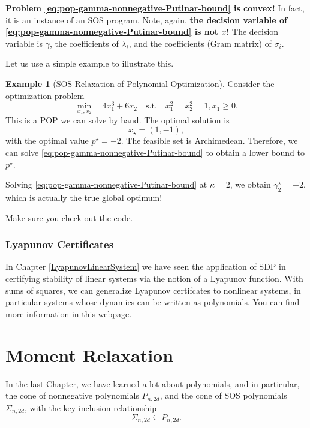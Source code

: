 \documentclass[
]{book}
\theoremstyle{definition}
\theoremstyle{definition}
\newtheorem{example}{Example}[chapter]
\theoremstyle{definition}
\theoremstyle{definition}
\theoremstyle{remark}
\begin{document}
\textbf{Problem \eqref{eq:pop-gamma-nonnegative-Putinar-bound} is convex!} In fact, it is an instance of an SOS program. Note, again, \textbf{the decision variable of \eqref{eq:pop-gamma-nonnegative-Putinar-bound} is not \(x\)!} The decision variable is \(\gamma\), the coefficients of \(\lambda_i\), and the coefficients (Gram matrix) of \(\sigma_i\).

Let us use a simple example to illustrate this.

\begin{example}[SOS Relaxation of Polynomial Optimization]
\protect\hypertarget{exm:SOSRelaxation}{}\label{exm:SOSRelaxation}Consider the optimization problem
\[
\min_{x_1,x_2} \quad 4 x_1^3 + 6 x_2  \quad \mathrm{s.t.}\quad x_1^2 = x_2^2 = 1, x_1 \geq 0.
\]
This is a POP we can solve by hand. The optimal solution is
\[
x_\star = (1,-1),
\]
with the optimal value \(p^\star = -2\).
The feasible set is Archimedean. Therefore, we can solve \eqref{eq:pop-gamma-nonnegative-Putinar-bound} to obtain a lower bound to \(p^\star\).

Solving \eqref{eq:pop-gamma-nonnegative-Putinar-bound} at \(\kappa=2\), we obtain \(\gamma_{2}^\star = -2\), which is actually the true global optimum!

Make sure you check out the \href{https://github.com/ComputationalRobotics/Semidefinite-Examples/blob/main/example_pop.m}{code}.
\end{example}

\subsection{Lyapunov Certificates}\label{lyapunov-certificates}

In Chapter \ref{LyapunovLinearSystem} we have seen the application of SDP in certifying stability of linear systems via the notion of a Lyapunov function. With sums of squares, we can generalize Lyapunov certifcates to nonlinear systems, in particular systems whose dynamics can be written as polynomials. You can \href{https://hankyang.seas.harvard.edu/OptimalControlEstimation/stability.html\#computing-lyapunov-certificates}{find more information in this webpage}.

\chapter{Moment Relaxation}\label{Moment}

In the last Chapter, we have learned a lot about polynomials, and in particular, the cone of nonnegative polynomials \(P_{n,2d}\), and the cone of SOS polynomials \(\Sigma_{n,2d}\), with the key inclusion relationship
\[
\Sigma_{n,2d} \subseteq P_{n,2d}.
\]
\end{document}
